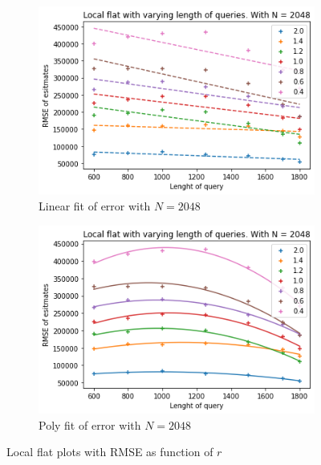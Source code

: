 \documentclass[11pt]{article}
\theoremstyle{definition}
\begin{document}
\begin{figure}[H]
\centering
\begin{subfigure}{.4\textwidth}
  \centering
  \includegraphics[width=\linewidth]{figures/local_flat/varying_r/loc_flat_varying_length_N_linear_=2048.png}
  \caption{Linear fit of error with $N=2048$}
  \label{fig:loc_r_sub2_lin}
\end{subfigure}%
\begin{subfigure}{.4\textwidth}
  \centering
  \includegraphics[width=\linewidth]{figures/local_flat/varying_r/loc_flat_varying_length_N_poly_=2048.png}
  \caption{Poly fit of error with $N=2048$ }
  \label{fig:loc_r_sub2_poly}
\end{subfigure}
\caption{Local flat plots with RMSE as function of $r$}
\label{fig:plt_loc_r_lin_poly_2}
\end{figure}
\end{document}
